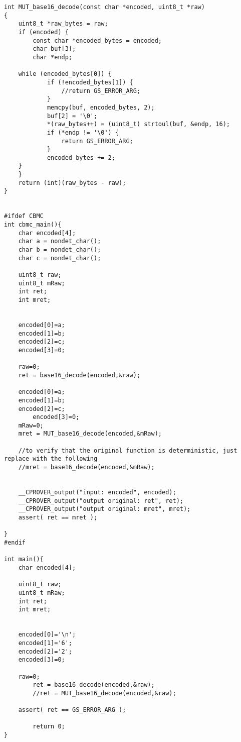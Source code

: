 \begin{lstlisting}[style=CStyle, caption=Second example of code for the identification of inputs with CBMC., label=GSLaugmentationTwo]
int MUT_base16_decode(const char *encoded, uint8_t *raw)
{
    uint8_t *raw_bytes = raw;
    if (encoded) {
        const char *encoded_bytes = encoded;
        char buf[3];
        char *endp;

	while (encoded_bytes[0]) {
            if (!encoded_bytes[1]) {
                //return GS_ERROR_ARG;
            }
            memcpy(buf, encoded_bytes, 2);
            buf[2] = '\0';
            *(raw_bytes++) = (uint8_t) strtoul(buf, &endp, 16);
            if (*endp != '\0') {
                return GS_ERROR_ARG;
            }
            encoded_bytes += 2;
	}
    }
    return (int)(raw_bytes - raw);
}


#ifdef CBMC
int cbmc_main(){
    char encoded[4];
	char a = nondet_char();
	char b = nondet_char();
	char c = nondet_char();

	uint8_t raw;
	uint8_t mRaw;
	int ret;
	int mret;

    
	encoded[0]=a;
	encoded[1]=b;
	encoded[2]=c;
    encoded[3]=0;

	raw=0;
    ret = base16_decode(encoded,&raw);

	encoded[0]=a;
	encoded[1]=b;
	encoded[2]=c;
        encoded[3]=0;
	mRaw=0;
    mret = MUT_base16_decode(encoded,&mRaw);
    
    //to verify that the original function is deterministic, just replace with the following
    //mret = base16_decode(encoded,&mRaw);


	__CPROVER_output("input: encoded", encoded);
	__CPROVER_output("output original: ret", ret);
	__CPROVER_output("output original: mret", mret);
	assert( ret == mret );
        
}
#endif

int main(){
    char encoded[4];

	uint8_t raw;
	uint8_t mRaw;
	int ret;
	int mret;

    
	encoded[0]='\n';
	encoded[1]='6';
	encoded[2]='2';
	encoded[3]=0;

	raw=0;
    	ret = base16_decode(encoded,&raw);
    	//ret = MUT_base16_decode(encoded,&raw);

	assert( ret == GS_ERROR_ARG );

    	return 0;
}
\end{lstlisting}


